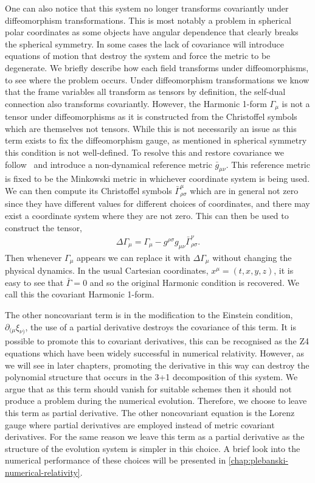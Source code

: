 \documentclass[10pt]{report}
\theoremstyle{definition}
\begin{document}
        One can also notice that this system no longer transforms covariantly under diffeomorphism transformations. This is most notably a problem in spherical polar coordinates as some objects have angular dependence that clearly breaks the spherical symmetry. In some cases the lack of covariance will introduce equations of motion that destroy the system and force the metric to be degenerate. We briefly describe how each field transforms under diffeomorphisms, to see where the problem occurs. Under diffeomorphism transformations we know that the frame variables all transform as tensors by definition, the self-dual connection also transforms covariantly. However, the Harmonic 1-form $\Gamma_\mu$ is not a tensor under diffeomorphisms as it is constructed from the Christoffel symbols which are themselves not tensors. While this is not necessarily an issue as this term exists to fix the diffeomorphism gauge, as mentioned in spherical symmetry this condition is not well-defined. To resolve this and restore covariance we follow~\cite{Covariant_formu_Brown_2009,Formulations_of_Alcubi_2010} and introduce a non-dynamical reference metric $\bar{g}_{\mu\nu}$. This reference metric is fixed to be the Minkowski metric in whichever coordinate system is being used. We can then compute its Christoffel symbols $\bar{\Gamma}^\mu_{\rho\sigma}$ which are in general not zero since they have different values for different choices of coordinates, and there may exist a coordinate system where they are not zero. This can then be used to construct the tensor,
        \begin{align}
            \Delta \Gamma_\mu = \Gamma_\mu - g^{\rho\sigma} g_{\mu\nu} \bar{\Gamma}^\nu_{\rho\sigma}.
        \end{align}
        Then whenever $\Gamma_\mu$ appears we can replace it with $\Delta \Gamma_\mu$ without changing the physical dynamics. In the usual Cartesian coordinates, $x^\mu = (t,x,y,z)$, it is easy to see that $\bar{\Gamma} = 0$ and so the original Harmonic condition is recovered. We call this the covariant Harmonic 1-form.

        The other noncovariant term is in the modification to the Einstein condition, $\partial_{(\mu} \xi_{\nu)}$, the use of a partial derivative destroys the covariance of this term. It is possible to promote this to covariant derivatives, this can be recognised as the Z4 equations \cite{General_covaria_Bona_2003} which have been widely successful in numerical relativity. However, as we will see in later chapters, promoting the derivative in this way can destroy the polynomial structure that occurs in the 3+1 decomposition of this system. We argue that as this term should vanish for suitable schemes then it should not produce a problem during the numerical evolution. Therefore, we choose to leave this term as partial derivative. The other noncovariant equation is the Lorenz gauge where partial derivatives are employed instead of metric covariant derivatives. For the same reason we leave this term as a partial derivative as the structure of the evolution system is simpler in this choice. A brief look into the numerical performance of these choices will be presented in \cref{chap:plebanski-numerical-relativity}.
    
\end{document}

